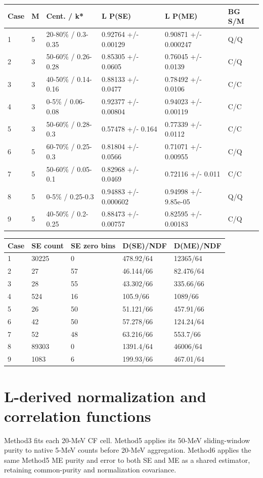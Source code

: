 \documentclass[10pt,a4paper]{article}
\begin{document}
{\small\setlength{\tabcolsep}{3pt}\begin{longtable}{llllll}\toprule
Case & M & Cent. / k* & L P(SE) & L P(ME) & BG S/M\\\midrule\endhead
1 & 5 & 20-80\% / 0.3-0.35 & 0.92764 +/- 0.00129 & 0.90871 +/- 0.000247 & Q/Q\\
2 & 3 & 50-60\% / 0.26-0.28 & 0.85305 +/- 0.0605 & 0.76045 +/- 0.0139 & C/Q\\
3 & 3 & 40-50\% / 0.14-0.16 & 0.88133 +/- 0.0477 & 0.78492 +/- 0.0106 & C/C\\
4 & 3 & 0-5\% / 0.06-0.08 & 0.92377 +/- 0.00804 & 0.94023 +/- 0.00119 & C/C\\
5 & 3 & 50-60\% / 0.28-0.3 & 0.57478 +/- 0.164 & 0.77339 +/- 0.0112 & C/C\\
6 & 5 & 60-70\% / 0.25-0.3 & 0.81804 +/- 0.0566 & 0.71071 +/- 0.00955 & C/Q\\
7 & 5 & 50-60\% / 0.05-0.1 & 0.82968 +/- 0.0469 & 0.72116 +/- 0.011 & C/C\\
8 & 5 & 0-5\% / 0.25-0.3 & 0.94883 +/- 0.000602 & 0.94998 +/- 9.85e-05 & Q/Q\\
9 & 5 & 40-50\% / 0.2-0.25 & 0.88473 +/- 0.00757 & 0.82595 +/- 0.00183 & C/Q\\
\bottomrule\end{longtable}}
{\small\setlength{\tabcolsep}{3pt}\begin{longtable}{lllll}\toprule
Case & SE count & SE zero bins & D(SE)/NDF & D(ME)/NDF\\\midrule\endhead
1 & 30225 & 0 & 478.92/64 & 12365/64\\
2 & 27 & 57 & 46.144/66 & 82.476/64\\
3 & 28 & 55 & 43.302/66 & 335.66/66\\
4 & 524 & 16 & 105.9/66 & 1089/66\\
5 & 26 & 50 & 51.121/66 & 457.91/66\\
6 & 42 & 50 & 57.278/66 & 124.24/64\\
7 & 52 & 48 & 63.216/66 & 553.7/66\\
8 & 89303 & 0 & 1391.4/64 & 46006/64\\
9 & 1083 & 6 & 199.93/66 & 467.01/64\\
\bottomrule\end{longtable}}
\clearpage
\section*{L-derived normalization and correlation functions}
Method3 fits each 20-MeV CF cell. Method5 applies its 50-MeV sliding-window purity to native 5-MeV counts before 20-MeV aggregation. Method6 applies the same Method5 ME purity and error to both SE and ME as a shared estimator, retaining common-purity and normalization covariance.
\end{document}
